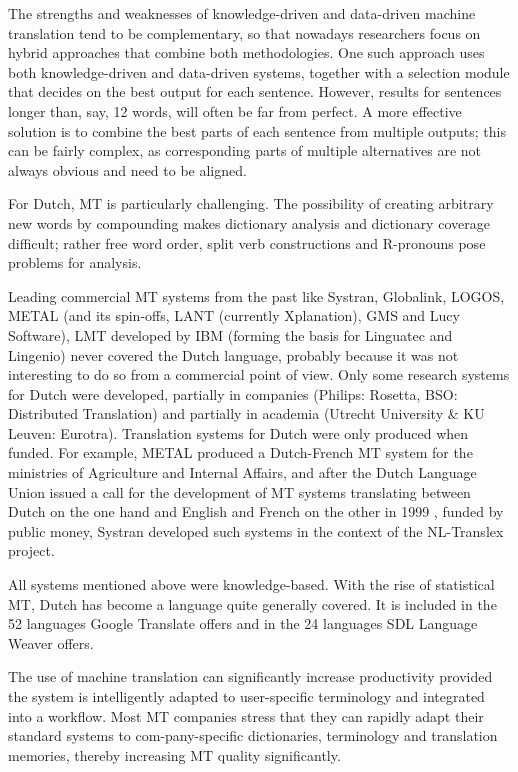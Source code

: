 \documentclass[]{../../metanetpaper}
\begin{document}
\begin{multicols}{2}
The strengths and weaknesses of knowledge-driven and data-driven machine translation tend to be complementary, so that nowadays researchers focus on hybrid approaches that combine both methodologies. One such approach uses both knowledge-driven and data-driven systems, together with a selection module that decides on the best output for each sentence. However, results for sentences longer than, say, 12 words, will often be far from perfect. A more effective solution is to combine the best parts of each sentence from multiple outputs; this can be fairly complex, as corresponding parts of multiple alternatives are not always obvious and need to be aligned. 


 For Dutch, MT is particularly challenging. The possibility of creating arbitrary new words by compounding makes dictionary analysis and dictionary coverage difficult; rather free word order, split verb constructions and R-pronouns pose problems for analysis.

    Leading commercial MT systems from the past like Systran, Globalink, LOGOS, METAL (and its spin-offs, LANT (currently Xplanation), GMS and Lucy Software), LMT developed by IBM (forming the basis for Linguatec  and Lingenio) never covered the Dutch language, probably because it was not interesting to do so from a commercial point of view. Only some research systems for Dutch were developed, partially in companies (Philips: Rosetta, BSO: Distributed Translation) and partially in academia (Utrecht University \& KU Leuven: Eurotra). Translation systems for Dutch were only produced when funded. For example, METAL produced a Dutch-French MT system for the ministries of Agriculture and Internal Affairs, and after the Dutch Language Union issued a call for the development of MT systems translating between Dutch on the one hand and English and French on the other in 1999 \cite{Cucchiarini:etal:2000},  funded by public money, Systran developed such systems in the context of the NL-Translex project.

    All systems mentioned above were knowledge-based. With the rise of statistical MT, Dutch has become a language quite generally covered. It is included in the 52 languages Google Translate offers and in the 24 languages SDL Language Weaver offers.

    The use of machine translation can significantly increase productivity provided the system is intelligently adapted to user-specific terminology and integrated into a workflow. Most MT companies stress that they can rapidly adapt their standard systems to com-pany-specific dictionaries, terminology and translation memories, thereby increasing MT quality significantly.


\end{multicols}
\end{document}
